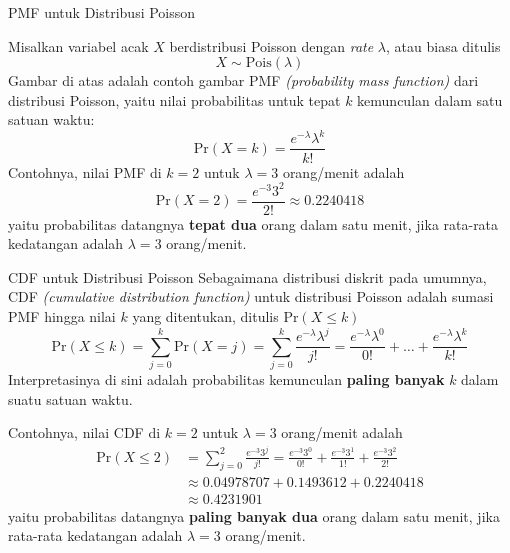 \documentclass{beamer}
\begin{document}
\begin{frame}{PMF untuk Distribusi Poisson}

    Misalkan variabel acak \(X\) berdistribusi Poisson dengan \textit{rate} \(\lambda\), atau biasa ditulis
    \[ X \sim \text{Pois}(\lambda) \]
    Gambar di atas adalah contoh gambar PMF \textit{(probability mass function)} dari distribusi Poisson, yaitu nilai probabilitas untuk tepat \(k\) kemunculan dalam satu satuan waktu:
    \[ \text{Pr}(X=k) = \frac{e^{-\lambda} \lambda^k}{k!} \]
    Contohnya, nilai PMF di \(k=2\) untuk \(\lambda = 3\) orang/menit adalah
    \[ \text{Pr}(X=2) = \frac{e^{-3} 3^2}{2!} \approx 0.2240418 \]
    yaitu probabilitas datangnya \textbf{tepat dua} orang dalam satu menit, jika rata-rata kedatangan adalah \(\lambda = 3\) orang/menit.
\end{frame}

\begin{frame}{CDF untuk Distribusi Poisson}
    Sebagaimana distribusi diskrit pada umumnya, CDF \textit{(cumulative distribution function)} untuk distribusi Poisson adalah sumasi PMF hingga nilai \(k\) yang ditentukan, ditulis \(\text{Pr}(X \le k)\)
    \[ \text{Pr}(X \le k) = \sum_{j=0}^{k} \text{Pr}(X = j) = \sum_{j=0}^{k} \frac{e^{-\lambda} \lambda^j}{j!} = \frac{e^{-\lambda} \lambda^0}{0!} + \dots + \frac{e^{-\lambda} \lambda^k}{k!} \]
    Interpretasinya di sini adalah probabilitas kemunculan \textbf{paling banyak} \(k\) dalam suatu satuan waktu.

    Contohnya, nilai CDF di \(k = 2\) untuk \( \lambda = 3 \) orang/menit adalah
    \begin{align*}
        \text{Pr}(X \le 2) &= \sum_{j=0}^{2} \frac{e^{-3} 3^j}{j!} = \frac{e^{-3} 3^0}{0!} + \frac{e^{-3} 3^1}{1!} + \frac{e^{-3} 3^2}{2!} \\
        &\approx 0.04978707 + 0.1493612 + 0.2240418 \\
        &\approx 0.4231901
    \end{align*}
    yaitu probabilitas datangnya \textbf{paling banyak dua} orang dalam satu menit, jika rata-rata kedatangan adalah \(\lambda = 3\) orang/menit.
\end{frame}
\end{document}
